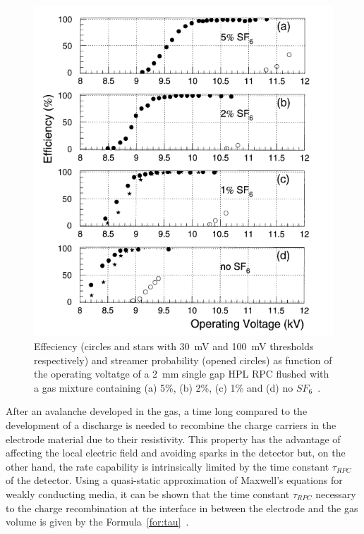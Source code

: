 	\begin{figure}[!h]
		\centering
		\includegraphics[width = 0.7\plotwidth]{fig/chapt3/SF6.png}
		\caption{\label{fig:SF6} Effeciency (circles and stars with \SI{30}{mV} and \SI{100}{mV} thresholds respectively) and streamer probability (opened circles) as function of the operating voltatge of a \SI{2}{mm} single gap HPL RPC flushed with a gas mixture containing (a) 5\%, (b) 2\%, (c) 1\% and (d) no $SF_6$~\cite{CAMARRI98}.}
	\end{figure}
	
	After an avalanche developed in the gas, a time long compared to the development of a discharge is needed to recombine the charge carriers in the electrode material due to their resistivity. This property has the advantage of affecting the local electric field and avoiding sparks in the detector but, on the other hand, the rate capability is intrinsically limited by the time constant $\tau_{RPC}$ of the detector. Using a quasi-static approximation of Maxwell’s equations for weakly conducting media, it can be shown that the time constant $\tau_{RPC}$ necessary to the charge recombination at the interface in between the electrode and the gas volume is given by the Formula~\ref{for:tau}~\cite{RIEGLER2002}.
	
